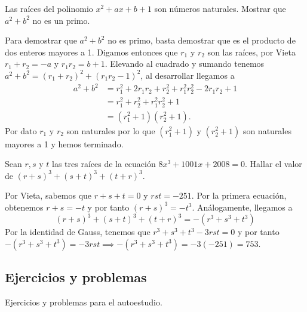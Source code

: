 \begin{example}[1986 URSS]
    Las raíces del polinomio $x^2 + ax + b + 1$ son números naturales.
    Mostrar que $a^2 + b^2$ no es un primo.
\end{example}
\begin{solution}
    Para demostrar que $a^2 + b^2$ no es primo, basta demostrar que es el producto de dos enteros mayores a 1.
    Digamos entonces que $r_1$ y $r_2$ son las raíces, por Vieta $r_1 + r_2 = -a$ y $r_1 r_2 = b + 1$.
    Elevando al cuadrado y sumando tenemos $a^2 + b^2 = (r_1 + r_2)^2 + (r_1 r_2 - 1)^2$, al desarrollar llegamos a
    \begin{align*}
        a^2 + b^2 &= r^2_1 + 2r_1 r_2 + r^2_2 + r^2_1 r^2_2 - 2r_1 r_2 + 1 \\
        &= r^2_1 + r^2_2 + r^2_1 r^2_2+ 1\\
        &= (r^2_1 + 1)(r^2_2 + 1).
    \end{align*}
    Por dato $r_1$ y $r_2$ son naturales por lo que $(r^2_1 + 1)$ y $(r^2_2 + 1)$ son naturales mayores a 1 y hemos terminado.
\end{solution}

\begin{example}[AIME II, 2008]
    Sean $r, s$ y $t$ las tres raíces de la ecuación $8x^3 + 1001x + 2008 = 0$.
    Hallar el valor de $(r + s)^3 + (s + t)^3 + (t + r)^3$.
\end{example}
\begin{solution}
    Por Vieta, sabemos que $r +  s + t = 0$ y $r s t = -251$.
    Por la primera ecuación, obtenemos $r + s = -t$ y por tanto $(r + s)^3 = - t^3$.
    Análogamente, llegamos a
    \[
        (r + s)^3 + (s + t)^3 + (t + r)^3 =  -(r^3 + s^3 + t^3)
    \]
    Por la identidad de Gauss, tenemos que $r^3 + s^3 + t^3 - 3rst = 0$ y por tanto $-(r^3 + s^3 + t^3) = -3rst \implies -(r^3 + s^3 + t^3) = -3(-251) = \boxed{753}$.
\end{solution}



\subsection{Ejercicios y problemas}

Ejercicios y problemas para el autoestudio.

